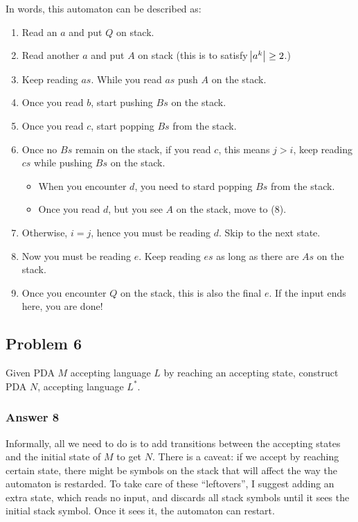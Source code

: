\documentclass[11pt]{article}
\begin{document}
In words, this automaton can be described as:
\begin{enumerate}
\item Read an $a$ and put $Q$ on stack.
\item Read another $a$ and put $A$ on stack (this is to satisfy $\abs{a^k} \geq
       2$.)
\item Keep reading $as$.  While you read $as$ push $A$ on the stack.
\item Once you read $b$, start pushing $Bs$ on the stack.
\item Once you read $c$, start popping $Bs$ from the stack.
\item Once no $Bs$ remain on the stack, if you read $c$, this means
$j > i$, keep reading $cs$ while pushing $Bs$ on the stack.
\begin{itemize}
\item When you encounter $d$, you need to stard popping $Bs$ from the stack.
\item Once you read $d$, but you see $A$ on the stack, move to (8).
\end{itemize}
\item Otherwise, $i = j$, hence you must be reading $d$.  Skip to
the next state.
\item Now you must be reading $e$.  Keep reading $es$ as long as there
are $As$ on the stack.
\item Once you encounter $Q$ on the stack, this is also the final $e$.
If the input ends here, you are done!
\end{enumerate}
\subsection{Problem 6}
\label{sec-1-6}
Given PDA $M$ accepting language $L$ by reaching an accepting state,
construct PDA $N$, accepting language $L^*$.

\subsubsection{Answer 8}
\label{sec-1-6-1}
Informally, all we need to do is to add transitions between the accepting
states and the initial state of $M$ to get $N$.  There is a caveat: if we
accept by reaching certain state, there might be symbols on the stack that
will affect the way the automaton is restarded.  To take care of these
``leftovers'', I suggest adding an extra state, which reads no input, and
discards all stack symbols until it sees the initial stack symbol.  Once it
sees it, the automaton can restart.
\end{document}
